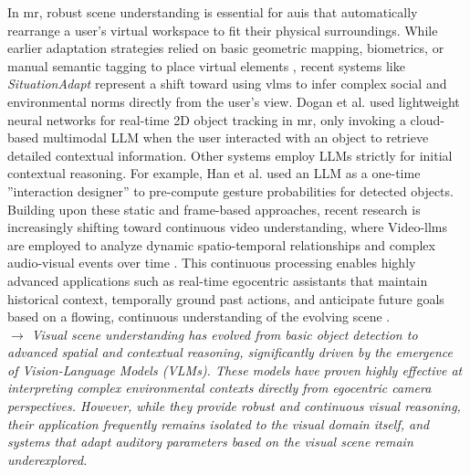 In \gls{mr}, robust scene understanding is essential for \glspl{aui} that automatically rearrange a user's virtual workspace to fit their physical surroundings. While earlier adaptation strategies relied on basic geometric mapping, biometrics, or manual semantic tagging to place virtual elements \cite{Lindlbauer_19_MRAdaptation, Cheng_23_InteractionAdapt, Cheng_21_SemanticAdapt}, recent systems like \textit{SituationAdapt} \cite{Li_24_SituationAdaptLLMReasoning} represent a shift toward using \glspl{vlm} to infer complex social and environmental norms directly from the user's view. Dogan et al. \cite{Dogan_24_ObjectIntelligenceInXR} used lightweight neural networks for real-time 2D object tracking in \gls{mr}, only invoking a cloud-based multimodal LLM when the user interacted with an object to retrieve detailed contextual information. Other systems employ LLMs strictly for initial contextual reasoning. For example, Han et al. \cite{Han_25_DBNMultimodalContextAwareInteractions} used an LLM as a one-time ''interaction designer'' to pre-compute gesture probabilities for detected objects. \\
Building upon these static and frame-based approaches, recent research is increasingly shifting toward continuous video understanding, where Video-\glspl{llm} are employed to analyze dynamic spatio-temporal relationships and complex audio-visual events over time \cite{Tang_25_SurveyOnVideoLLM, Zhu_25_WhyAudioANDVisual}. This continuous processing enables highly advanced applications such as real-time egocentric assistants that maintain historical context, temporally ground past actions, and anticipate future goals based on a flowing, continuous understanding of the evolving scene \cite{Huang_25_VinciVideoLLMScene}.
\\

\textit{$\rightarrow$ Visual scene understanding has evolved from basic object detection to advanced spatial and contextual reasoning, significantly driven by the emergence of Vision-Language Models (VLMs). These models have proven highly effective at interpreting complex environmental contexts directly from egocentric camera perspectives. However, while they provide robust and continuous visual reasoning, their application frequently remains isolated to the visual domain itself, and systems that adapt auditory parameters based on the visual scene remain underexplored.}

